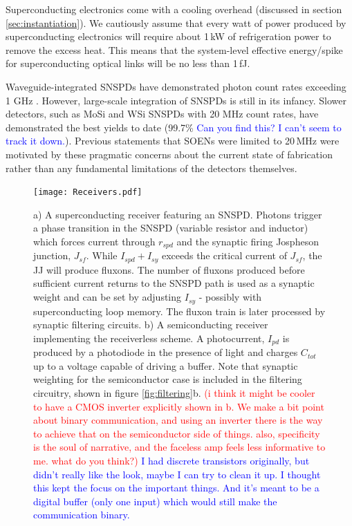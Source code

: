 \documentclass[twocolumn]{article}
\begin{document}
Superconducting electronics come with a cooling overhead (discussed in section \ref{sec:instantiation}). We cautiously assume that every watt of power produced by superconducting electronics will require about 1\,kW of refrigeration power to remove the excess heat. This means that the system-level effective energy/spike for superconducting optical links will be no less than 1\,fJ.

Waveguide-integrated SNSPDs have demonstrated photon count rates exceeding 1 GHz \cite{vetter2016cavity}. However, large-scale integration of SNSPDs is still in its infancy. Slower detectors, such as MoSi and WSi SNSPDs with 20 MHz count rates, have demonstrated the best yields to date (99.7\% \cite{Varun's array paper from 2020} \textcolor{blue}{Can you find this? I can't seem to track it down.}). Previous statements that SOENs were limited to 20\,MHz were motivated by these pragmatic concerns about the current state of fabrication rather than any fundamental limitations of the detectors themselves.

\begin{figure}
    \centering
    \texttt{[image: Receivers.pdf]}
    \caption{a) A superconducting receiver featuring an SNSPD. Photons trigger a phase transition in the SNSPD (variable resistor and inductor) which forces current through $r_{spd}$ and the synaptic firing Jospheson junction, $J_{sf}$. While $I_{spd} + I_{sy}$ exceeds the critical current of $J_{sf}$, the JJ will produce fluxons. The number of fluxons produced before sufficient current returns to the SNSPD path is used as a synaptic weight and can be set by adjusting $I_{sy}$ - possibly with superconducting loop memory. The fluxon train is later processed by synaptic filtering circuits. b) A semiconducting receiver implementing the receiverless scheme. A photocurrent, $I_{pd}$ is produced by a photodiode in the presence of light and charges $C_{tot}$ up to a voltage capable of driving a buffer. Note that synaptic weighting for the semiconductor case is included in the filtering circuitry, shown in figure \ref{fig:filtering}b. \textcolor{red}{(i think it might be cooler to have a CMOS inverter explicitly shown in b. We make a bit point about binary communication, and using an inverter there is the way to achieve that on the semiconductor side of things. also, specificity is the soul of narrative, and the faceless amp feels less informative to me. what do you think?)} \textcolor{blue}{I had discrete transistors originally, but didn't really like the look, maybe I can try to clean it up. I thought this kept the focus on the important things. And it's meant to be a digital buffer (only one input) which would still make the communication binary.}}
    \label{fig:sup_synapse}
\end{figure}
\end{document}

